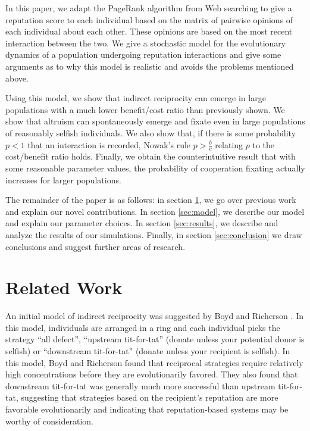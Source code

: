 \documentclass{amsart}
\newcommand{\f}[2]{\frac{#1}{#2}}
\begin{document}
In this paper, we adapt the PageRank algorithm from Web searching to
give a reputation score to each individual based on the matrix of
pairwise opinions of each individual about each other. These opinions
are based on the most recent interaction between the two. We give a
stochastic model for the evolutionary dynamics of a population
undergoing reputation interactions and give some arguments as to why
this model is realistic and avoids the problems mentioned above.

Using this model, we show that indirect reciprocity can emerge in
large populations with a much lower benefit/cost ratio than previously
shown. We show that altruism can spontaneously emerge and fixate even
in large populations of reasonably selfish individuals. We also show
that, if there is some probability $p < 1$ that an interaction is
recorded, Nowak's rule $p > \f{b}{c}$ relating $p$ to the cost/benefit
ratio holds. Finally, we obtain the counterintuitive result that with
some reasonable parameter values, the probability of cooperation
fixating actually increases for larger populations.


The remainder of the paper is as follows: in section
\ref{sec:related}, we go over previous work and explain our novel
contributions. In section \ref{sec:model}, we describe our model and
explain our parameter choices. In section \ref{sec:results}, we
describe and analyze the results of our simulations. Finally, in
section \ref{sec:conclusion} we draw conclusions and suggest further
areas of research.

\section{Related Work}\label{sec:related}

An initial model of indirect reciprocity was suggested by Boyd and
Richerson \cite{boyd_evolution_1989}. In this model, individuals are
arranged in a ring and each individual picks the strategy ``all
defect'', ``upstream tit-for-tat'' (donate unless your potential donor
is selfish) or ``downstream tit-for-tat'' (donate unless your
recipient is selfish). In this model, Boyd and Richerson found that
reciprocal strategies require relatively high concentrations before
they are evolutionarily favored. They also found that downstream
tit-for-tat was generally much more successful than upstream
tit-for-tat, suggesting that strategies based on the recipient's
reputation are more favorable evolutionarily and indicating that
reputation-based systems may be worthy of consideration.
\end{document}
